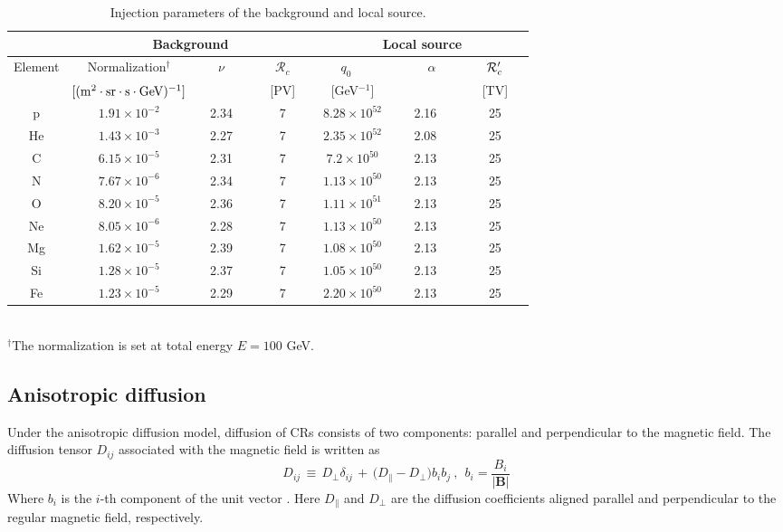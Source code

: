 \documentclass[a4paper,11pt]{article}
\renewcommand{\vec}[1]{\boldsymbol{#1}}
\begin{document}
\begin{table*}
	\begin{center}
		\begin{tabular}{|c|ccc|ccc|}
			\hline
			& \multicolumn{3}{c|}{Background} & \multicolumn{3}{c|}{Local source} \\
			\hline
			Element & Normalization$^\dagger$ & ~~~$\nu$~~~  & ~~~$\mathcal R_{c}$~~~ & ~~~$q_0$~~~~~ & ~~~~~$\alpha$~~~ & ~~~${\cal R}'_c$~~~ \\
			\hline
			& $[({\rm m}^2\cdot {\rm sr}\cdot {\rm s}\cdot {\rm GeV})^{-1}]$ & & [PV] & [GeV$^{-1}$] & &  [TV] \\
			\hline
			p   & $1.91\times 10^{-2}$    & 2.34   &  7  & $8.28\times 10^{52}$  & 2.16 & 25 \\
			He & $1.43\times 10^{-3}$   & 2.27     &  7  & $2.35\times 10^{52}$  & 2.08  &  25  \\
			C   & $6.15\times 10^{-5}$   & 2.31    &  7  & $7.2\times 10^{50}$    & 2.13 &  25  \\
			N   & $7.67\times 10^{-6}$   & 2.34    &  7  & $1.13\times 10^{50}$  & 2.13 &   25  \\
			O   & $8.20\times 10^{-5}$   & 2.36    &  7  & $1.11\times 10^{51}$ & 2.13  &   25  \\
			Ne & $8.05\times 10^{-6}$   & 2.28   &  7  & $1.13\times 10^{50}$ & 2.13  &  25 \\
			Mg & $1.62\times 10^{-5}$   & 2.39     &  7  & $1.08\times 10^{50}$ & 2.13  &  25  \\
			Si & $1.28\times 10^{-5}$     & 2.37   &  7  & $1.05\times 10^{50}$ & 2.13  &   25  \\
			Fe & $1.23\times 10^{-5}$    & 2.29    &  7  & $2.20\times 10^{50}$ & 2.13   &  25  \\
			\hline
		\end{tabular}\\
		$^\dagger${The normalization is set at total energy $E = 100$ GeV.}
	\end{center}
	\caption{Injection parameters of the background and local source.}
	\label{tab:para_inj}
\end{table*}


\subsection{ Anisotropic diffusion}

Under the anisotropic diffusion model,
diffusion of CRs consists of  two components: parallel  and  perpendicular to the magnetic field. 
The diffusion tensor $D_{ij}$ associated with the magnetic field is written as
\begin{equation}
D_{ij}\,\equiv\,D_\perp\delta_{ij}\,+\,\big(D_\|-D_\perp\big)b_ib_j ~, ~ ~  
b_i = \dfrac{B_i}{|\vec{B}|}
\label{eq:D_ij_1}
\end{equation}
Where $b_i$ is the $i$-th component of the unit vector  \citep {1999ApJ...520..204G}.
Here $D_{\parallel}$ and $D_{\perp}$ are the diffusion coefficients aligned parallel and perpendicular to the regular magnetic field, respectively.
\end{document}

